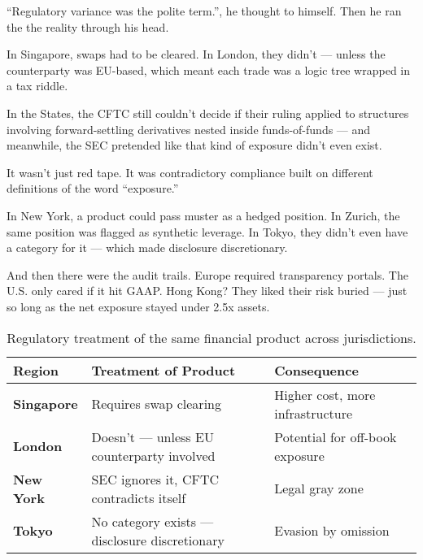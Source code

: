 ``Regulatory variance was the polite term.'', he thought to himself. Then he ran the
the reality through his head.

\medskip

\begin{tcolorbox}[
    enhanced,
    sharp corners,
    boxrule=0pt,
    colback=gray!3,
    borderline west={2pt}{0pt}{gray!60}, %
    left=10pt,
    right=10pt,
    top=6pt,
    bottom=6pt,
    width=\linewidth,
    fontupper=\small\itshape
  ]
  In Singapore, swaps had to be cleared.  
  In London, they didn’t — unless the counterparty was EU-based, which meant each trade was a logic tree wrapped in a tax riddle.

  \medskip
  
  In the States, the CFTC still couldn’t decide if their ruling applied to structures involving forward-settling derivatives nested inside funds-of-funds —  
  and meanwhile, the SEC pretended like that kind of exposure didn’t even exist.

  \medskip
  
  
  It wasn’t just red tape.  
  It was contradictory compliance built on different definitions of the word “exposure.”

  \medskip
  
  
  In New York, a product could pass muster as a hedged position.  
  In Zurich, the same position was flagged as synthetic leverage.  
  In Tokyo, they didn’t even have a category for it — which made disclosure discretionary.

  \medskip
  
  And then there were the audit trails.  
  Europe required transparency portals.  
  The U.S. only cared if it hit GAAP.  
  Hong Kong? They liked their risk buried — just so long as the net exposure stayed under 2.5x assets.
\end{tcolorbox}
  
\medskip

\begin{table}[H]
  \centering
  \begin{tabularx}{\linewidth}{>{\bfseries}l X X}
  \toprule
  Region & Treatment of Product & Consequence \\
  \midrule
  Singapore & Requires swap clearing & Higher cost, more infrastructure \\
  London & Doesn't — unless EU counterparty involved & Potential for off-book exposure \\
  New York & SEC ignores it, CFTC contradicts itself & Legal gray zone \\
  Tokyo & No category exists — disclosure discretionary & Evasion by omission \\
  \bottomrule
  \end{tabularx}
  \caption{Regulatory treatment of the same financial product across jurisdictions.}
\end{table}

